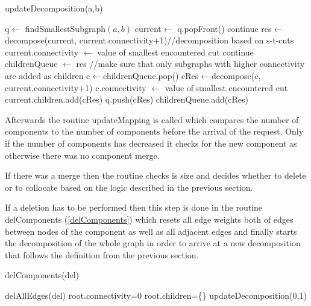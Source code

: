 \documentclass[a4paper,xcolor=dvipsnames, tikz, 12pt]{article}
\theoremstyle{definition}
\begin{document}
\begin{algorithm}
	\caption{updateDecomposition(a,b)}
	\label{updateDecomposition}
	\begin{algorithmic}
		\STATE q$\leftarrow$ findSmallestSubgraph$(a,b)$
		\STATE current$\leftarrow$ q.popFront()
		\STATE continue
		\ENDIF
		\STATE res$\leftarrow$ decompose(current, current.connectivity+1)//decomposition based on s-t-cuts
		\STATE current.connectivity $\leftarrow$ value of smallest encountered cut
		\STATE continue
		\ENDIF
		\STATE childrenQueue $\leftarrow$ res
		\STATE //make sure that only subgraphs with higher connectivity are added as children
		\STATE c$\leftarrow$childrenQueue.pop()
		\STATE cRes$\leftarrow$decompose(c, current.connectivity+1)
		\STATE c.connectivity $\leftarrow$ value of smallest encountered cut
		\STATE current.children.add(cRes)
		\STATE q.push(cRes)
		\ENDIF
		\ELSE
		\STATE childrenQueue.add(cRes)
		\ENDIF
		\ENDWHILE
		\ENDWHILE
	\end{algorithmic}		
\end{algorithm}

Afterwards the routine updateMapping is called which compares the number of components to the number of components before the arrival of the request. Only if the number of components has decreased it checks for the new component as otherwise there was no component merge. 

If there was a merge then the routine checks is size and decides whether to delete or to collocate based on the logic described in the previous section.

If a deletion has to be performed then this step is done in the routine delComponents (\cref{delComponents}) which resets all edge weights both of edges between nodes of the component as well as all adjacent edges and finally starts the decomposition of the whole graph in order to arrive at a new decomposition that follows the definition from the previous section.



\begin{algorithm}
	\caption{delComponents(del)}
	\label{delComponents}
	\begin{algorithmic}
		\STATE delAllEdges(del)
		\STATE root.connectivity=0
		\STATE root.children=\{\}
		\STATE updateDecomposition(0,1)
	\end{algorithmic}
\end{algorithm}
\end{document}
